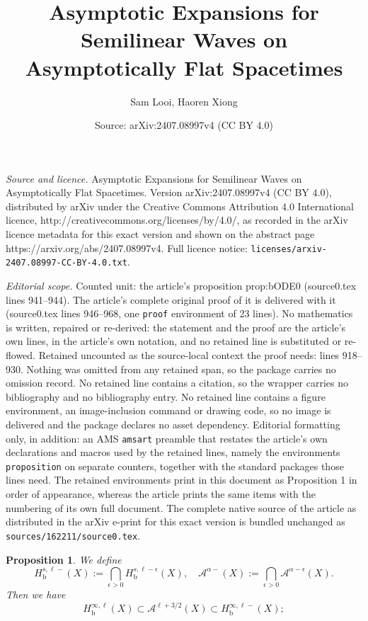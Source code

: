 \documentclass[10pt,a4paper]{amsart}
\title{Asymptotic Expansions for Semilinear Waves on Asymptotically Flat Spacetimes}
\author{Sam Looi, Haoren Xiong}
\date{Source: arXiv:2407.08997v4 (CC BY 4.0)}
\newtheorem{proposition}{Proposition}
\newcommand{\Hb}{H_\text{b}}
\newcommand{\cA}{\mathcal A}
\newcommand{\eps}{\epsilon}
\begin{document}
\maketitle

\noindent\emph{Source and licence.} Asymptotic Expansions for Semilinear Waves on Asymptotically Flat Spacetimes. Version arXiv:2407.08997v4 (CC BY 4.0), distributed by arXiv under the Creative Commons Attribution 4.0 International licence, http://creativecommons.org/licenses/by/4.0/, as recorded in the arXiv licence metadata for this exact version and shown on the abstract page https://arxiv.org/abs/2407.08997v4. Full licence notice: \texttt{licenses/arxiv-2407.08997-CC-BY-4.0.txt}.\par\smallskip

\noindent\textit{Editorial scope.} Counted unit: the article's proposition prop:bODE0 (source0.tex lines 941--944). The article's complete original proof of it is delivered with it (source0.tex lines 946--968, one \texttt{proof} environment of 23 lines). No mathematics is written, repaired or re-derived: the statement and the proof are the article's own lines, in the article's own notation, and no retained line is substituted or re-flowed.  Retained uncounted as the source-local context the proof needs: lines 918--930.  Nothing was omitted from any retained span, so the package carries no omission record.  No retained line contains a citation, so the wrapper carries no bibliography and no bibliography entry.  No retained line contains a figure environment, an image-inclusion command or drawing code, so no image is delivered and the package declares no asset dependency.  Editorial formatting only, in addition: an AMS \texttt{amsart} preamble that restates the article's own declarations and macros used by the retained lines, namely the environments \texttt{proposition} on separate counters, together with the standard packages those lines need.  The retained environments print in this document as Proposition 1 in order of appearance, whereas the article prints the same items with the numbering of its own full document.  The complete native source of the article as distributed in the arXiv e-print for this exact version is bundled unchanged as \texttt{sources/162211/source0.tex}.
\begin{proposition}
\label{prop:Sobolev embedding}
We define
\[
  \Hb^{s,\ell-}(X) := \bigcap_{\eps>0} \Hb^{s,\ell-\eps}(X),\quad
  \cA^{\alpha-}(X) := \bigcap_{\eps>0} \cA^{\alpha-\eps}(X).
\]
Then we have
\begin{equation}
\label{EqASobolevEmb}
  \Hb^{\infty,\ell}(X) \subset \cA^{\ell+3/2}(X) \subset \Hb^{\infty,\ell-}(X);
\end{equation}
\end{proposition}
\end{document}
